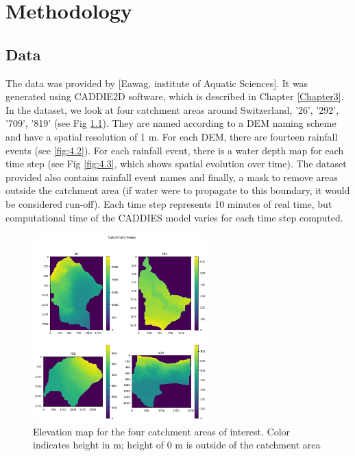 
\chapter{Methodology} %
\label{Chapter4} %

\section{Data}

The data was provided by [Eawag, institute of Aquatic Sciences]. It was generated using CADDIE2D software, which is described in Chapter \ref{Chapter3}. In the dataset, we look at four catchment areas around Switzerland, '26', '292', '709', '819' (see Fig \ref{fig:4.1}). They are named according to a DEM naming scheme and have a spatial resolution of 1 m. For each DEM, there are fourteen rainfall events (see \ref{fig:4.2}). For each rainfall event, there is a water depth  map for each time step (see Fig \ref{fig:4.3}, which shows spatial evolution over time). The dataset provided also contains rainfall event names and  finally, a mask to remove areas outside the catchment area (if water were to propagate to this boundary, it would be considered run-off). Each time step represents 10 minutes of real time, but computational time of the CADDIES model varies for each time step computed.

\begin{figure}[htbp]
	\includegraphics[width=0.6\textwidth]{../Figures/Catchment_dems.png}
	\centering
	\caption[FourDems]{Elevation map for the four catchment areas of interest. Color indicates height in m; height of 0 m is outside of the catchment area} 
	\label{fig:4.1}
\end{figure}

